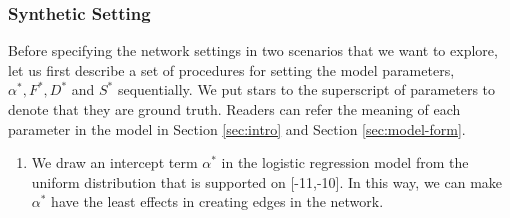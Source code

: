 \documentclass[AMS,STIX1COL]{WileyNJD-v2}
\begin{document}
{\subsubsection{Synthetic Setting} \label{sec:Syn-set}
Before specifying the network settings in two scenarios that we want to explore, let us first describe a set of procedures for setting the model parameters, $\alpha^*, F^*, D^*$ and $S^*$ sequentially.
We put stars to the superscript of parameters to denote that they are ground truth.
Readers can refer the meaning of each parameter in the model in Section \ref{sec:intro} and Section \ref{sec:model-form}.

\begin{enumerate}
    \item We draw an intercept term $\alpha^*$ in the logistic regression model from the uniform distribution that is supported on [-11,-10].
        In this way, we can make $\alpha^*$ have the least effects in creating edges in the network.


\end{enumerate}}
\end{document}
